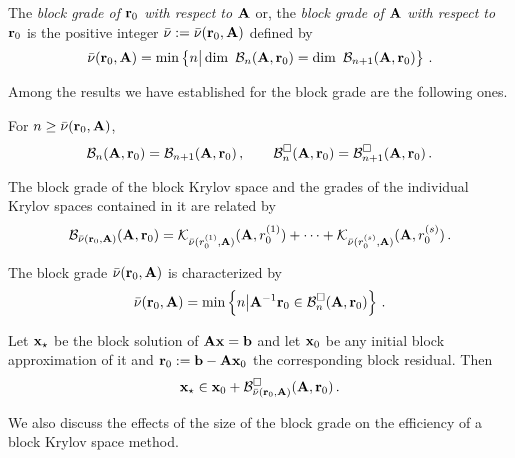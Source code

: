 \documentclass{report}
\begin{document}
The \textit{block grade of\/ ${\mathbf r}_0$ with respect to\/ ${\mathbf A}$} or,
the \textit{block grade of\/ ${\mathbf A}$ with respect to\/ ${\mathbf r}_0$} is
the positive integer $\bar\nu := \bar\nu({\mathbf r}_0,{\mathbf A})$
defined by
\[
\bar\nu({\mathbf r}_0,{\mathbf A})
= \min \left\{n \big\vert \mathop{\mathrm{dim\ }} {\mathcal B}_n({\mathbf A}, {\mathbf r}_0) =
\mathop{\mathrm{dim\ }} {\mathcal B}_{n+1}({\mathbf A}, {\mathbf r}_0) \right\}\,.
\]

Among the results we have established for the block grade are the
following ones.

\begin{Lem}\label{lemBI-BlKSS1}
For $n \geq \bar\nu({\mathbf r}_0,{\mathbf A})$,
\[
{\mathcal B}_n({\mathbf A}, {\mathbf r}_0) = {\mathcal B}_{n+1}({\mathbf A}, {\mathbf r}_0)\,,\quad\quad
{\mathcal B}^{\Box}_n({\mathbf A}, {\mathbf r}_0) = {\mathcal B}^{\Box}_{n+1}({\mathbf A}, {\mathbf r}_0)\,.
\]
\end{Lem}

\begin{Lem}\label{lemBI-BlKSS5}
The block grade of the block Krylov space and the grades of
the individual Krylov spaces contained in it are related by
\[
{\mathcal B}_{\bar\nu({\mathbf r}_0,{\mathbf A})}({\mathbf A}, {\mathbf r}_0)
= \mathcal{K}_{\bar\nu(r_0^{(1)},{\mathbf A})}({\mathbf A}, r_0^{(1)}) + \dots
+ \mathcal{K}_{\bar\nu(r_0^{(s)},{\mathbf A})}({\mathbf A}, r_0^{(s)})\,.
\]
\end{Lem}

\begin{Lem}\label{lemBI-BlKSS2}
The block grade $\bar\nu({\mathbf r}_0,{\mathbf A})$ is characterized by
\[
\bar\nu({\mathbf r}_0,{\mathbf A}) =
\min\left\{ n \big\vert {\mathbf A}^{-1} {\mathbf r}_0 \in {\mathcal B}^{\Box}_n({\mathbf A}, {\mathbf r}_0) \right\}
\,.
\]
\end{Lem}

\begin{Thm}\label{corBI-BlKSS2'}
Let ${\mathbf x}_{\mbox{\scriptsize $\star$}}$ be the block solution of ${\mathbf A}{\mathbf x} = {\mathbf b}$ and let ${\mathbf x}_0$ be
any initial block approximation of it and ${\mathbf r}_0 := {\mathbf b} - {\mathbf A} {\mathbf x}_0$
the corresponding block residual. Then
\[
{\mathbf x}_{\mbox{\scriptsize $\star$}} \in {\mathbf x}_0 + {\mathcal B}^{\Box}_{\bar\nu({\mathbf r}_0,{\mathbf A})}({\mathbf A},{\mathbf r}_0) \,.
\]
\end{Thm}

We also discuss the effects of the size of the block grade on the
efficiency of a block Krylov space method.
\end{document}
